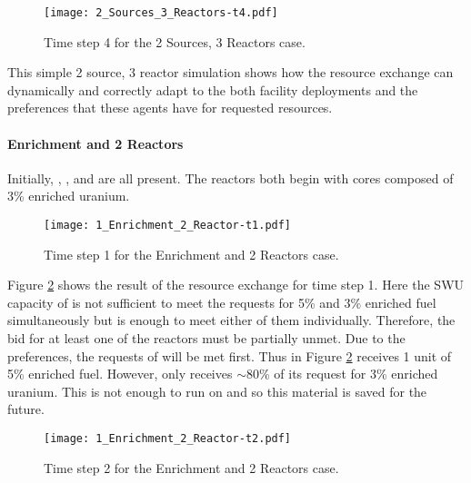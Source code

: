 \begin{figure}
  \begin{center}
    \texttt{[image: 2\_Sources\_3\_Reactors-t4.pdf]}
    \caption[]{\label{fig::2srcs3rxts-t4}Time step 4 for the 2 Sources, 3 Reactors 
        case.}
  \end{center}
\end{figure}

This simple 2 source, 3 reactor simulation shows how the resource 
exchange can dynamically and correctly adapt to the both facility deployments and
the preferences that these agents have for requested resources.

\paragraph{Enrichment and 2 Reactors}
\label{subsect::1enr2rxts}

Initially, \Enrichment{}, , and  are all present. The reactors both begin with cores composed of 3\% enriched uranium. 

\begin{figure}
  \begin{center}
    \texttt{[image: 1\_Enrichment\_2\_Reactor-t1.pdf]}
    \caption[]{\label{fig::enr2rxts-t1}Time step 1 for the Enrichment and 2 Reactors 
        case.}
  \end{center}
\end{figure}

Figure \ref{fig::enr2rxts-t1} shows the result of the resource exchange for time
step 1.  Here the SWU capacity of \Enrichment{} is not sufficient to meet the
requests for 5\% and 3\% enriched fuel simultaneously but is enough to meet
either of them individually.  Therefore, the bid for at least one of the
reactors must be partially unmet.  Due to the preferences, the requests
of  will be met first.  Thus in
Figure \ref{fig::enr2rxts-t1}  receives 1 unit of 5\% enriched fuel.
However,  only receives $\sim$80\% of its request for 3\% enriched
uranium.  This is not enough to run on and so this material is saved for the
future.

\begin{figure}
  \begin{center}
    \texttt{[image: 1\_Enrichment\_2\_Reactor-t2.pdf]}
    \caption[]{\label{fig::enr2rxts-t2}Time step 2 for the Enrichment and 2 Reactors 
        case.}
  \end{center}
\end{figure}


